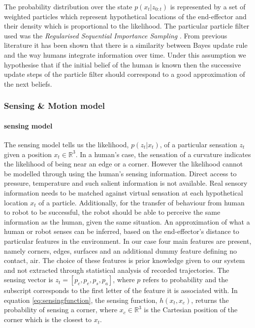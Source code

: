 The probability distribution over the state $p(x_{t}|z_{0:t})$ is represented by a set of weighted particles which represent hypothetical
locations of the end-effector and  their density which is proportional to the likelihood. The particular particle filter used was the 
\textit{Regularised Sequential Importance Sampling} \cite[p.182]{Arul_Mask_Clap_2002}. 
From previous literature \cite{Bake_Saxe_Tene_2011} it has been shown that there is a similarity between Bayes update rule and the way humans integrate information over time. 
Under this assumption we hypothesise that if the initial belief of the human is known then the successive update steps of the particle filter should correspond to a good approximation 
of the next beliefs. 

\subsubsection{Sensing \& Motion model}
\paragraph{sensing model}
The sensing model tells us the likelihood, $p(z_t|x_t)$, of a particular sensation $z_t$ given
a position $x_t \in \mathbb{R}^{3}$. In a human's case, the sensation of a curvature indicates the likelihood of being near an edge
or a corner. However the likelihood cannot be modelled through using the human's sensing information.
Direct access to pressure, temperature and such salient information is not available. Real sensory information needs to be matched against 
virtual sensation at each hypothetical location $x_t$ of a particle. Additionally,  for the transfer of behaviour from human to robot to be successful, the robot should be
able to perceive the same information as the human, given the same situation. An approximation of what a human or robot senses can be inferred, based on the
end-effector's distance to particular features in the environment. In our case four main features are present, namely corners, edges, surfaces and an additional dummy feature defining no
contact, air. The choice of these features is prior knowledge given to our system and not extracted through statistical analysis of recorded trajectories. 
The sensing vector is $z_t = \left[p_c,p_e,p_s,p_a\right]$, where $p$ refers to probability and the subscript corresponds to the first letter of the feature it is associated with. In
equation \ref{eq:sensingfunction}, the sensing function, $h(x_t,x_c)$, returns the probability of sensing a corner, where $x_c \in \mathbb{R}^3$ is the Cartesian position of the corner which is
the closest to $x_t$. 

